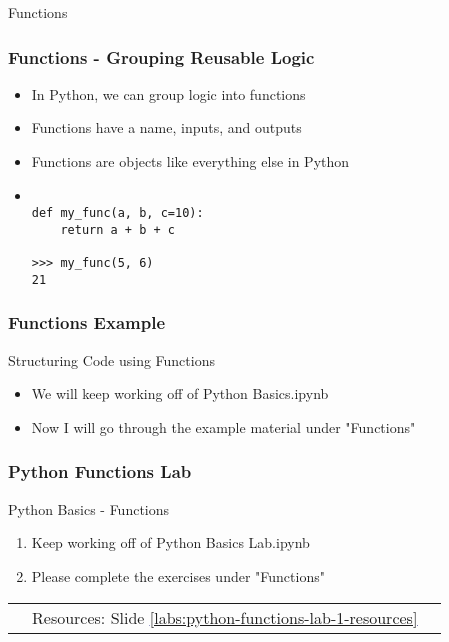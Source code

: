 \documentclass[handout, 11pt]{beamer}
\begin{document}
\begin{section}{Functions}
\begin{frame}[fragile]
\frametitle{Functions - Grouping Reusable Logic}
\begin{itemize}
\item In Python, we can group logic into functions
\vfill
\item Functions have a name, inputs, and outputs
\vfill
\item Functions are objects like everything else in Python
\vfill
\item \begin{verbatim}

def my_func(a, b, c=10):
    return a + b + c

>>> my_func(5, 6)
21

\end{verbatim}
\end{itemize}
\end{frame}
\begin{frame}
\frametitle{Functions Example}
{
\begin{block}{Structuring Code using Functions}
\begin{itemize}
\item We will keep working off of Python Basics.ipynb
\item Now I will go through the example material under "Functions"
\end{itemize}
\end{block}
}
\end{frame}
\begin{frame}
\frametitle{Python Functions Lab}
{
\begin{block}{Python Basics - Functions}
\begin{enumerate}
\item Keep working off of Python Basics Lab.ipynb
\item Please complete the exercises under "Functions"
\end{enumerate}
\vfill
\begin{tabular*}{\textwidth}{@{\extracolsep{\fill}}ccc}
\toprule
\hfill & Resources: Slide \textcolor{blue}{\underline{\ref{labs:python-functions-lab-1-resources}}} & \hfill\\

\end{tabular*}
\end{block}
}
\label{labs:python-functions-lab-1}
\end{frame}
\end{section}
\end{document}
